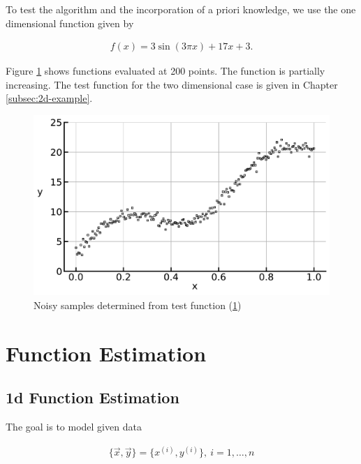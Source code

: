 \documentclass[10pt,a4paper]{report}
\begin{document}
To test the algorithm and the incorporation of a priori knowledge, we use the one dimensional function given by 

\begin{align}\label{eq:test_func}
	f(x) = 3\sin(3\pi x) + 17x + 3.
\end{align}

Figure \ref{fig:test_func} shows functions evaluated at 200 points. The function is partially increasing.  The test function for the two dimensional case is given in Chapter \ref{subsec:2d-example}. 

\begin{figure}[H]
	\centering
	\includegraphics[width=\columnwidth]{../thesisplots/test_func.pdf}
	\caption{Noisy samples determined from test function (\ref{fig:test_func})}
	\label{fig:test_func}
\end{figure}

\section{Function Estimation}

\subsection{1d Function Estimation} \label{subsec:1d-function-estimation}

The goal is to model given data

\begin{align} \label{eq:data}
	\{\vec{x}, \vec{y}\} = \{x^{(i)}, y^{(i)}\}, \ i = 1, \dots, n 
\end{align}
\end{document}
